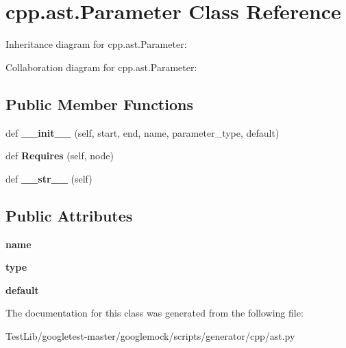 \hypertarget{classcpp_1_1ast_1_1Parameter}{}\section{cpp.\+ast.\+Parameter Class Reference}
\label{classcpp_1_1ast_1_1Parameter}


Inheritance diagram for cpp.\+ast.\+Parameter\+:


Collaboration diagram for cpp.\+ast.\+Parameter\+:
\subsection*{Public Member Functions}
\begin{DoxyCompactItemize}
\item 
\mbox{\label{classcpp_1_1ast_1_1Parameter_a4fe27f559d44adac9e9b5898ba76c5b3}} 
def {\bfseries \+\_\+\+\_\+init\+\_\+\+\_\+} (self, start, end, name, parameter\+\_\+type, default)
\item 
\mbox{\label{classcpp_1_1ast_1_1Parameter_a4bc5c17a0d606d35be40cb4c2c1a67a6}} 
def {\bfseries Requires} (self, node)
\item 
\mbox{\label{classcpp_1_1ast_1_1Parameter_aabfbabb3c744a0da4a012ceb4299947a}} 
def {\bfseries \+\_\+\+\_\+str\+\_\+\+\_\+} (self)
\end{DoxyCompactItemize}
\subsection*{Public Attributes}
\begin{DoxyCompactItemize}
\item 
\mbox{\label{classcpp_1_1ast_1_1Parameter_aae0375fb0ded8fa9090feea6bdff2784}} 
{\bfseries name}
\item 
\mbox{\label{classcpp_1_1ast_1_1Parameter_a5eed090000c41551a10c21f175ad33e3}} 
{\bfseries type}
\item 
\mbox{\label{classcpp_1_1ast_1_1Parameter_a4ceae2ac87d82c5542c4e7385eb4c97e}} 
{\bfseries default}
\end{DoxyCompactItemize}


The documentation for this class was generated from the following file\+:\begin{DoxyCompactItemize}
\item 
Test\+Lib/googletest-\/master/googlemock/scripts/generator/cpp/ast.\+py\end{DoxyCompactItemize}
